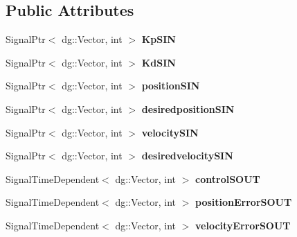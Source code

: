 \subsection*{Public Attributes}
\begin{DoxyCompactItemize}
\item 
Signal\+Ptr$<$ dg\+::\+Vector, int $>$ {\bfseries Kp\+S\+IN}\hypertarget{classdynamicgraph_1_1sot_1_1PDController_ad4fc27adfdc622ff227b2df5dd9ff3e3}{}\label{classdynamicgraph_1_1sot_1_1PDController_ad4fc27adfdc622ff227b2df5dd9ff3e3}

\item 
Signal\+Ptr$<$ dg\+::\+Vector, int $>$ {\bfseries Kd\+S\+IN}\hypertarget{classdynamicgraph_1_1sot_1_1PDController_ade6af9695793655239b9df09cc013852}{}\label{classdynamicgraph_1_1sot_1_1PDController_ade6af9695793655239b9df09cc013852}

\item 
Signal\+Ptr$<$ dg\+::\+Vector, int $>$ {\bfseries position\+S\+IN}\hypertarget{classdynamicgraph_1_1sot_1_1PDController_aa28a076a093e91de78ab10ff4bf257d3}{}\label{classdynamicgraph_1_1sot_1_1PDController_aa28a076a093e91de78ab10ff4bf257d3}

\item 
Signal\+Ptr$<$ dg\+::\+Vector, int $>$ {\bfseries desiredposition\+S\+IN}\hypertarget{classdynamicgraph_1_1sot_1_1PDController_ae90d924ffaf3c4e54af32a25ddb136f1}{}\label{classdynamicgraph_1_1sot_1_1PDController_ae90d924ffaf3c4e54af32a25ddb136f1}

\item 
Signal\+Ptr$<$ dg\+::\+Vector, int $>$ {\bfseries velocity\+S\+IN}\hypertarget{classdynamicgraph_1_1sot_1_1PDController_a501c2b9b92bb5b4d4bc6ea9190b9a87e}{}\label{classdynamicgraph_1_1sot_1_1PDController_a501c2b9b92bb5b4d4bc6ea9190b9a87e}

\item 
Signal\+Ptr$<$ dg\+::\+Vector, int $>$ {\bfseries desiredvelocity\+S\+IN}\hypertarget{classdynamicgraph_1_1sot_1_1PDController_a30f38b6ea6a9ba584a4b0ccf02af925a}{}\label{classdynamicgraph_1_1sot_1_1PDController_a30f38b6ea6a9ba584a4b0ccf02af925a}

\item 
Signal\+Time\+Dependent$<$ dg\+::\+Vector, int $>$ {\bfseries control\+S\+O\+UT}\hypertarget{classdynamicgraph_1_1sot_1_1PDController_a39554a8525100823dfface5d0eb5846a}{}\label{classdynamicgraph_1_1sot_1_1PDController_a39554a8525100823dfface5d0eb5846a}

\item 
Signal\+Time\+Dependent$<$ dg\+::\+Vector, int $>$ {\bfseries position\+Error\+S\+O\+UT}\hypertarget{classdynamicgraph_1_1sot_1_1PDController_af45ff8d1a1d6c7c4c1eb18e51b0311bc}{}\label{classdynamicgraph_1_1sot_1_1PDController_af45ff8d1a1d6c7c4c1eb18e51b0311bc}

\item 
Signal\+Time\+Dependent$<$ dg\+::\+Vector, int $>$ {\bfseries velocity\+Error\+S\+O\+UT}\hypertarget{classdynamicgraph_1_1sot_1_1PDController_a91745aa2d68db845e4b27ba67b39baa9}{}\label{classdynamicgraph_1_1sot_1_1PDController_a91745aa2d68db845e4b27ba67b39baa9}

\end{DoxyCompactItemize}
